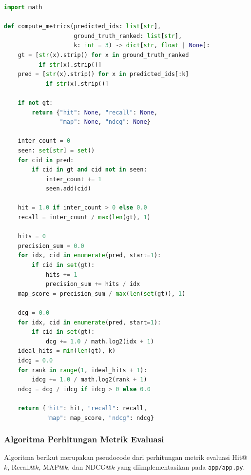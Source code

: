 \begin{lstlisting}[language=Python, caption={Perhitungan metrik evaluasi: Hit, Recall, MAP, dan NDCG}, label={lst:compute_metrics}]
import math

def compute_metrics(predicted_ids: list[str],
                    ground_truth_ranked: list[str],
                    k: int = 3) -> dict[str, float | None]:
    gt = [str(x).strip() for x in ground_truth_ranked
          if str(x).strip()]
    pred = [str(x).strip() for x in predicted_ids[:k]
            if str(x).strip()]

    if not gt:
        return {"hit": None, "recall": None,
                "map": None, "ndcg": None}

    inter_count = 0
    seen: set[str] = set()
    for cid in pred:
        if cid in gt and cid not in seen:
            inter_count += 1
            seen.add(cid)

    hit = 1.0 if inter_count > 0 else 0.0
    recall = inter_count / max(len(gt), 1)

    hits = 0
    precision_sum = 0.0
    for idx, cid in enumerate(pred, start=1):
        if cid in set(gt):
            hits += 1
            precision_sum += hits / idx
    map_score = precision_sum / max(len(set(gt)), 1)

    dcg = 0.0
    for idx, cid in enumerate(pred, start=1):
        if cid in set(gt):
            dcg += 1.0 / math.log2(idx + 1)
    ideal_hits = min(len(gt), k)
    idcg = 0.0
    for rank in range(1, ideal_hits + 1):
        idcg += 1.0 / math.log2(rank + 1)
    ndcg = dcg / idcg if idcg > 0 else 0.0

    return {"hit": hit, "recall": recall,
            "map": map_score, "ndcg": ndcg}
\end{lstlisting}

\subsubsection{Algoritma Perhitungan Metrik Evaluasi}

Algoritma berikut merupakan pseudocode dari perhitungan metrik evaluasi Hit@$k$, Recall@$k$, MAP@$k$, dan NDCG@$k$ yang diimplementasikan pada \texttt{app/app.py}.

